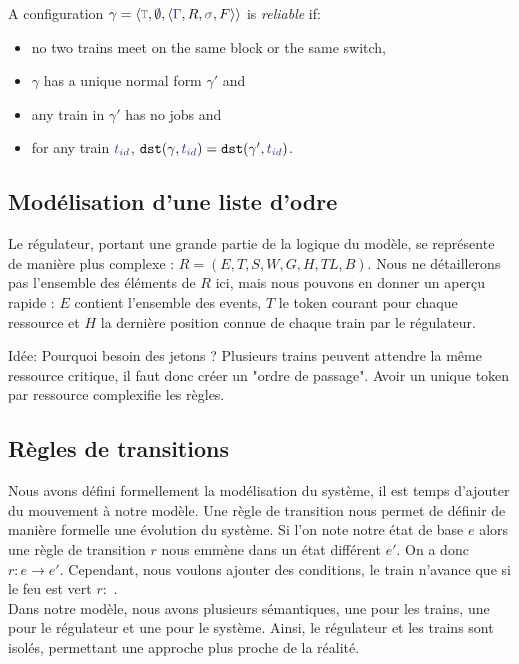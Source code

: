 \documentclass[runningheads]{llncs}
\newcommand{\tuple}[1]{\ensuremath{\langle #1\rangle}}
\newcommand{\swFmt}[1]{{\color{swcolor}{#1}}}
\newcommand{\switches}{\ensuremath{\swFmt{\sigma}}}
\newcommand{\trainFmt}[1]{{\color{traincolor} #1}}
\newcommand{\trainSeq}{\trainFmt{\Gamma\xspace}}
\newcommand{\tid}[1]{\ensuremath{\trainFmt{t_{#1}}}}
\newcommand{\regulator}{\ensuremath{R}}
\newcommand{\signals}{\ensuremath{F}}
\newcommand{\stateTuple}[4]{\tuple{#1, #2, #3, #4}}
\newcommand{\guardFmt}[1]{{\color{guardcolor} \ensuremath{\mathtt{#1}}}}
\newcommand{\guardT}{\guardFmt{T}}
\newcommand{\redTuple}[3]{\ensuremath{\tuple{#1, #2, #3}}}
\begin{document}
A configuration $\gamma = \redTuple{\guardT}{\emptyset}{\stateTuple{\trainSeq{}}{\regulator}{\switches}{\signals}} $  is \emph{reliable} if: 
\begin{itemize}
\item  no two trains meet on the same block or the same switch, 
\item $\gamma$ has  a unique normal form $\gamma'$ and 
\item any train in $\gamma'$ has no jobs and 
\item for any train $\tid{id}$, $\mathtt{dst}(\gamma, \tid{id}) =  \mathtt{dst}(\gamma', \tid{id})$. 
\end{itemize}


\subsection{Modélisation d'une liste d'odre}
Le régulateur, portant une grande partie de la logique du modèle, se représente de manière plus complexe : $R = (E,T,S,W,G,H,TL,B)$.
Nous ne détaillerons pas l'ensemble des éléments de $R$ ici, mais nous pouvons en donner un aperçu rapide : $E$ contient l'ensemble des events,
$T$ le token courant pour chaque ressource et $H$ la dernière position connue de chaque train par le régulateur.

Idée: Pourquoi besoin des jetons ? Plusieurs trains peuvent attendre la même ressource critique, il faut donc créer un "ordre de passage".
Avoir un unique token par ressource complexifie les règles.


\subsection{Règles de transitions}
Nous avons défini formellement la modélisation du système, il est temps d'ajouter du mouvement à notre modèle.
Une règle de transition nous permet de définir de manière formelle une évolution du système. 
Si l'on note notre état de base $e$ alors une règle de transition $r$ nous emmène dans un état différent $e'$. On a donc $r: e \rightarrow e'$.
Cependant, nous voulons ajouter des conditions, le train n'avance que si le feu est vert $r:$ .
\\Dans notre modèle, nous avons plusieurs sémantiques, une pour les trains, une pour le régulateur et une pour le système.
Ainsi, le régulateur et les trains sont isolés, permettant une approche plus proche de la réalité.\\
\end{document}
